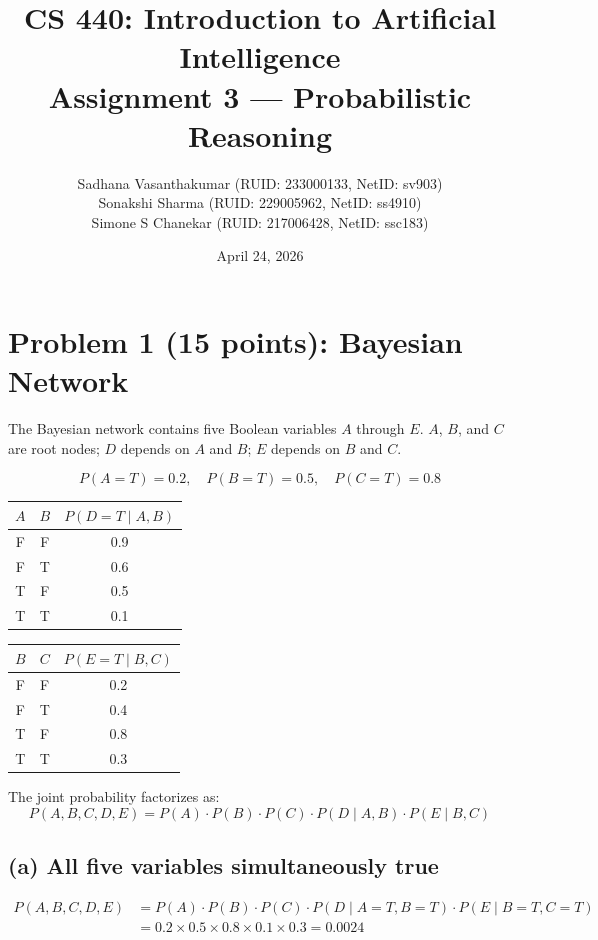 \documentclass[12pt]{article}
\title{
    \textbf{CS 440: Introduction to Artificial Intelligence}\\
    \large Assignment 3 --- Probabilistic Reasoning
}
\author{
    Sadhana Vasanthakumar (RUID: 233000133, NetID: sv903)\\
    Sonakshi Sharma (RUID: 229005962, NetID: ss4910)\\
    Simone S Chanekar (RUID: 217006428, NetID: ssc183)
}
\date{April 24, 2026}
\begin{document}
\maketitle
\tableofcontents
\newpage

\section{Problem 1 (15 points): Bayesian Network}

The Bayesian network contains five Boolean variables $A$ through $E$.
$A$, $B$, and $C$ are root nodes; $D$ depends on $A$ and $B$; $E$ depends on $B$ and $C$.

\[
P(A=T)=0.2,\quad P(B=T)=0.5,\quad P(C=T)=0.8
\]

\begin{center}
\begin{tabular}{ccc}
\toprule
$A$ & $B$ & $P(D=T \mid A,B)$\\
\midrule
F & F & 0.9\\
F & T & 0.6\\
T & F & 0.5\\
T & T & 0.1\\
\bottomrule
\end{tabular}
\qquad
\begin{tabular}{ccc}
\toprule
$B$ & $C$ & $P(E=T \mid B,C)$\\
\midrule
F & F & 0.2\\
F & T & 0.4\\
T & F & 0.8\\
T & T & 0.3\\
\bottomrule
\end{tabular}
\end{center}

The joint probability factorizes as:
\[
P(A,B,C,D,E)=P(A)\cdot P(B)\cdot P(C)\cdot P(D\mid A,B)\cdot P(E\mid B,C)
\]

\subsection*{(a) All five variables simultaneously true}

\begin{align*}
P(A,B,C,D,E)
  &= P(A)\cdot P(B)\cdot P(C)\cdot P(D\mid A{=}T,B{=}T)\cdot P(E\mid B{=}T,C{=}T)\\
  &= 0.2\times0.5\times0.8\times0.1\times0.3 = \boxed{0.0024}
\end{align*}
\end{document}
